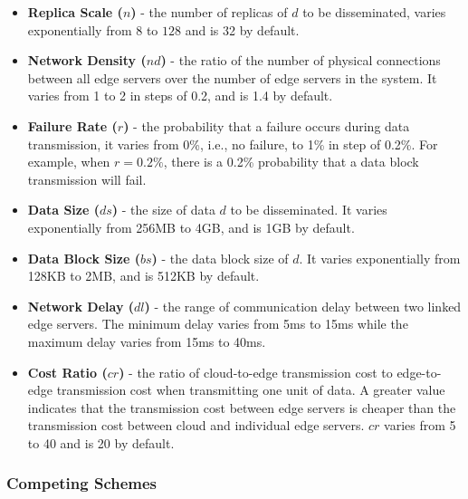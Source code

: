 \documentclass[10pt,journal,compsoc]{IEEEtran}
\begin{document}
\begin{itemize}
    \item \textbf{Replica Scale ($n$)} - the number of replicas of $d$ to be disseminated, varies exponentially from $8$ to $128$ and is 32 by default. 
    
    \item \textbf{Network Density ($nd$)} - the ratio of the number of physical connections between all edge servers over the number of edge servers in the system. It varies from 1 to 2 in steps of 0.2, and is 1.4 by default. %

    \item \textbf{Failure Rate ($r$)} - the probability that a failure occurs during data transmission, it varies from 0\%, i.e., no failure, to 1\% in step of 0.2\%. For example, when $r = 0.2\%$, there is a 0.2\% probability that a data block transmission will fail. %
    
    \item \textbf{Data Size ($ds$)} - the size of data $d$ to be disseminated. It varies exponentially from 256MB to 4GB, and is 1GB by default.
    
    \item \textbf{Data Block Size ($bs$)} - the data block size of $d$. It varies exponentially from 128KB to 2MB, and is 512KB by default.
    
    \item \textbf{Network Delay ($dl$)} - the range of communication delay between two linked edge servers. The minimum delay varies from 5ms to 15ms while the maximum delay varies from 15ms to 40ms. 
    
    \item \textbf{Cost Ratio ($cr$)} - the ratio of cloud-to-edge transmission cost to edge-to-edge transmission cost when transmitting one unit of data. A greater value indicates that the transmission cost between edge servers is cheaper than the transmission cost between cloud and individual edge servers. $cr$ varies from 5 to 40 and is 20 by default.
\end{itemize}

%
\subsubsection{Competing Schemes}
\label{subsubSec:Baseline}
\end{document}
